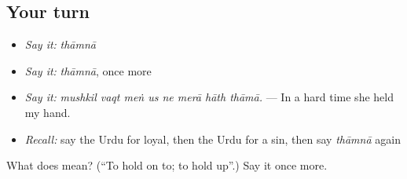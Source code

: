 \subsection*{Your turn}
\begin{itemize}
\raggedright
  \item \emph{Say it:} \emph{thāmnā}
  \item \emph{Say it:} \emph{thāmnā}, once more
  \item \emph{Say it:} \emph{mushkil vaqt meṅ us ne merā hāth thāmā.} — In a hard time she held my hand.
  \item \emph{Recall:} say the Urdu for loyal, then the Urdu for a sin, then say \emph{thāmnā} again
\end{itemize}

\begin{tcolorbox}[breakable,colback=teal!4,colframe=teal!35!black,title={Before you move on}]
What does  mean? (\textquotedblleft{}To hold on to; to hold up\textquotedblright{}.) Say it once more.
\end{tcolorbox}
